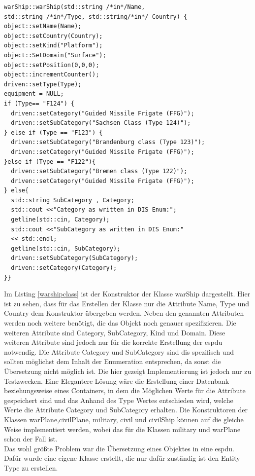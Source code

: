 \begin{lstlisting}[caption =Konstruktor  \glqq warShip\grqq{} Klasse ,label=warshipclass]
warShip::warShip(std::string /*in*/Name,
std::string /*in*/Type, std::string/*in*/ Country) {
object::setName(Name);
object::setCountry(Country);
object::setKind("Platform");
object::SetDomain("Surface");
object::setPosition(0,0,0);
object::incrementCounter();
driven::setType(Type);
equipment = NULL;
if (Type== "F124") {
  driven::setCategory("Guided Missile Frigate (FFG)");
  driven::setSubCategory("Sachsen Class (Type 124)");
} else if (Type == "F123") {
  driven::setSubCategory("Brandenburg class (Type 123)");
  driven::setCategory("Guided Missile Frigate (FFG)");
}else if (Type == "F122"){
  driven::setSubCategory("Bremen class (Type 122)");
  driven::setCategory("Guided Missile Frigate (FFG)");
} else{
  std::string SubCategory , Category;
  std::cout <<"Category as written in DIS Enum:";
  getline(std::cin, Category);
  std::cout <<"SubCategory as written in DIS Enum:"
  << std::endl;
  getline(std::cin, SubCategory);
  driven::setSubCategory(SubCategory);
  driven::setCategory(Category);
}}
\end{lstlisting}
Im Listing \ref{warshipclass} ist der Konstruktor der Klasse \glqq warShip\grqq{} dargestellt. Hier ist zu sehen, dass für das Erstellen der Klasse nur die Attribute \glqq Name\grqq{}, \glqq Type\grqq{} und \glqq Country\grqq{} dem Konstruktor übergeben werden. Neben den genannten Attributen werden noch weitere benötigt, die das Objekt noch genauer spezifizieren.
Die weiteren Attribute sind  \glqq Category\grqq{}, \glqq SubCategory\grqq{}, \glqq Kind\grqq{} und  \glqq Domain\grqq{}. Diese weiteren Attribute sind jedoch nur für die korrekte Erstellung der \ac{espdu} notwendig.
Die Attribute   \glqq Category\grqq{} und \glqq SubCategory\grqq{} sind \ac{dis} spezifisch und sollten möglichst dem Inhalt der Enumeration entsprechen, da sonst die Übersetzung nicht möglich ist. 
Die hier gezeigt Implementierung ist jedoch nur zu Testzwecken. Eine Elegantere Lösung wäre die Erstellung einer Datenbank beziehungsweise eines Containers, in dem die Möglichen Werte für die Attribute gespeichert sind und das Anhand des  \glqq Type\grqq{}  Wertes entschieden wird, welche Werte die Attribute  \glqq Category\grqq{} und \glqq SubCategory\grqq{} erhalten. Die Konstruktoren der Klassen  \glqq warPlane\grqq{},\glqq civilPlane\grqq{}, \glqq military\grqq{}, \glqq civil\grqq{} und \glqq civilShip\grqq{} können auf die gleiche Weise implementiert werden, wobei das für die Klassen \glqq military\grqq{} und \glqq warPlane\grqq{} schon der Fall ist.\\
Das wohl größte Problem war die Übersetzung eines Objektes in eine \ac{espdu}. Dafür wurde eine eigene Klasse erstellt, die nur dafür zuständig ist den \glqq Entity Type \grqq{} zu erstellen.




